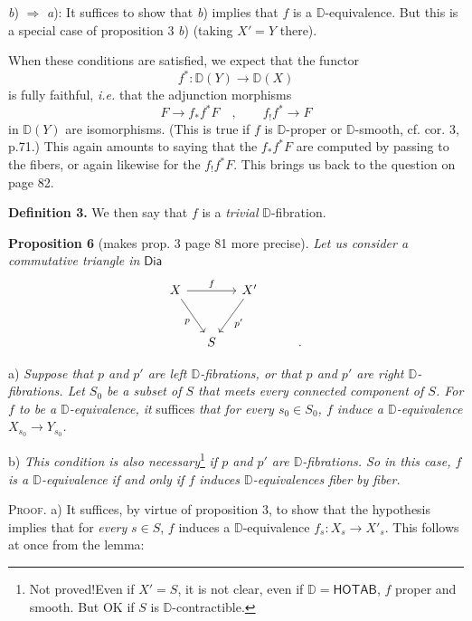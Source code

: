 \documentclass[11pt]{article}
\newcommand{\printedpage}[1]{\marginpar{\footnotesize p.~#1}}
\newcommand{\msp}[1]{\marginpar{\footnotesize [#1]}}
\newcommand{\DD}{\mathbb{D}}
\newcommand{\Dia}{\mathsf{Dia}}
\begin{document}
\textit{b}) $\Rightarrow$ \textit{a}): It suffices to show that \textit{b}) implies that $f$ is a $\DD$-equivalence. But this is a special case of proposition 3 \textit{b}) (taking $X' = Y$ there).

\msp{page 84}

When these conditions are satisfied, we expect that the functor
\[
f^* : \DD(Y) \longrightarrow \DD(X)
\]
is fully faithful, \textit{i.e.} that the adjunction morphisms %
\[
F \longrightarrow f_*f^*F \quad , \qquad f_!f^* \longrightarrow F %
\]
in $\DD(Y)$ are isomorphisms. (This is true if $f$ is $\DD$-proper or $\DD$-smooth, cf. cor. 3, p.71.) This again amounts to saying that the $f_*f^*F$ are computed by passing to the fibers, or again likewise for the $f_!f^*F$. This brings us back to the question on page 82.

\textbf{Definition 3.} We then say that $f$ is a \textit{trivial} $\DD$-fibration.

\textbf{Proposition 6} (makes prop. 3 page 81 more precise). \textit{Let us consider a commutative triangle in} $\Dia$
\[
\begin{tikzcd}[column sep=small, row sep=large]
X \arrow[rr, "f"] \arrow[dr, "p"'] & & X' \arrow[dl, "p'"] \\
& S & & & .
\end{tikzcd}
\]

\printedpage{52}

\indent a) \textit{Suppose that $p$ and $p'$ are left $\DD$-fibrations, or that $p$ and $p'$ are right $\DD$-fibrations. Let $S_0$ be a subset of $S$ that meets every connected component of $S$. For $f$ to be a $\DD$-equivalence, it} suffices \textit{that for every $s_0 \in S_0$, $f$ induce a $\DD$-equivalence $X_{s_0} \to Y_{s_0}$.}

\indent b) \textit{This condition is also necessary}\footnote[40]{Not proved!\footnotemark[41] Even if $X' = S$, it is not clear, even if $\DD = \mathsf{HOTAB}$, $f$ proper and smooth. But OK if $S$ is $\DD$-contractible.} \textit{if $p$ and $p'$ are $\DD$-fibrations. So in this case, $f$ is a $\DD$-equivalence if and only if $f$ induces $\DD$-equivalences fiber by fiber.}

\msp{page 85}

\textsc{Proof.} a) It suffices, by virtue of proposition 3, to show that the hypothesis implies that for \textit{every} $s \in S$, $f$ induces a $\DD$-equivalence $f_s : X_s \to X'_s$. This follows at once from the lemma:
\end{document}
